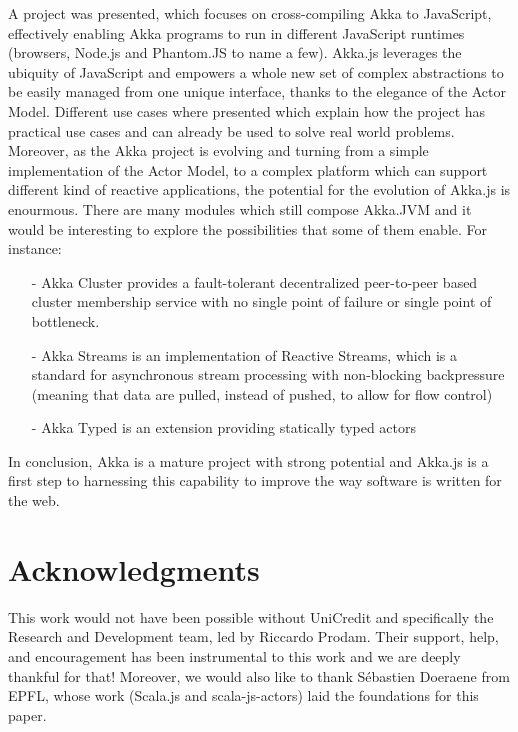 \documentclass{sig-alternate}
\begin{document}
A project was presented, which focuses on cross-compiling Akka to JavaScript, effectively enabling Akka programs to run in different
JavaScript runtimes (browsers, Node.js and Phantom.JS to name a few).
Akka.js leverages the ubiquity of JavaScript and empowers a whole new set of complex abstractions to be easily managed from one
unique interface, thanks to the elegance of the Actor Model. Different use cases where presented which explain how the project
has practical use cases and can already be used to solve real world problems.
Moreover, as the Akka project is evolving and turning from a simple implementation of the Actor Model, to a complex platform
which can support different kind of reactive applications, the potential for the evolution of Akka.js is enourmous.
There are many modules which still compose Akka.JVM and it would be interesting to explore the possibilities that some of them
enable. For instance:
\begin{itemize}
\item[-] Akka Cluster provides a fault-tolerant decentralized peer-to-peer based cluster membership service with no single point of failure or single point of bottleneck.
\item[-] Akka Streams is an implementation of Reactive Streams, which is a standard for asynchronous stream processing with non-blocking backpressure (meaning that data
are pulled, instead of pushed, to allow for flow control)
\item[-] Akka Typed is an extension providing statically typed actors
\end{itemize}
In conclusion, Akka is a mature project with strong potential and Akka.js is a first step to harnessing this capability to
improve the way software is written for the web.


\section{Acknowledgments}

This work would not have been possible without UniCredit and specifically the Research and Development team, led by Riccardo Prodam. Their support, help, and encouragement has been instrumental to this work and we are deeply thankful for that!
Moreover, we would also like to thank S\'{e}bastien Doeraene from EPFL, whose work (Scala.js and scala-js-actors) laid the foundations for this paper.



%

%
%

\end{document}
